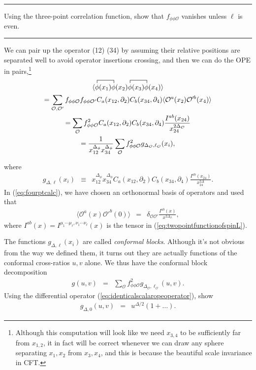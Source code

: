 \documentclass[12pt]{article}
\numberwithin{equation}{section}
\newcommand\be{\begin{eqnarray}}
\newcommand\ee{\end{eqnarray}}
\newcommand\f\phi
\newcommand\cO{\mathcal{O}}
\newcommand\p[1]{\left(#1\right)}
\newcommand\ptl\partial
\newcommand\<\langle
\renewcommand\>\rangle
\newcommand\de\delta
\renewcommand\.{\cdot}
\newcommand\SO{\mathrm{SO}}
\newcommand\De{\Delta}
\begin{document}

\noindent\rule[0.5ex]{\linewidth}{1pt}
\label{exercise:elleven}
Using the three-point correlation function, show that $f_{\f\f\cO}$ vanishes unless $\ell$ is even.

\noindent\rule[0.5ex]{\linewidth}{1pt}

We can pair up the operator (12) (34) by assuming their relative positions are separated well to avoid operator insertions crossing, and then we can do the OPE in pairs,\footnote{Although this computation will look like we need $x_{3,4}$ to be sufficiently far from $x_{1,2}$, it in fact will be correct whenever we can draw any sphere separating $x_1,x_2$ from $x_3,x_4$, and this is because the beautiful scale invariance in CFT.}
\begin{multline}
\<
\contraction{}{\f}{(x_1)}{\f}
\f(x_1)\f(x_2)
\contraction{}{\f}{(x_1)}{\f}
\f(x_3)\f(x_4)
\> \\
= \sum_{\cO,\cO'}f_{\f\f\cO}f_{\f\f\cO'} C_a(x_{12},\ptl_2)C_b(x_{34},\ptl_4)\<\cO^a(x_2)\cO'^b(x_4)\> \\
= \sum_\cO f_{\f\f\cO}^2 C_a(x_{12},\ptl_2)C_b(x_{34},\ptl_4)\frac{I^{ab}(x_{24})}{x_{24}^{2\De_\cO}} \\
= \frac{1}{x_{12}^{\De_\f} x_{34}^{\De_\f}}\sum_\cO f_{\f\f\cO}^2 g_{\De_\cO,\ell_\cO}(x_i),
\end{multline}

where
\be
\label{eq:olddefinitionofg}
g_{\De,\ell}(x_i) &\equiv& x_{12}^{\De_\f} x_{34}^{\De_\f} C_a(x_{12},\ptl_2)C_b(x_{34},\ptl_4)\frac{I^{ab}(x_{24})}{x_{24}^{2\De}}.
\ee
In (\ref{eq:fourptcalc}), we have chosen an orthonormal basis of operators and used that
\be
\label{eq:canonicallynormalizedtwopt}
\<\cO^a(x)\cO'^b(0)\> &=& \de_{\cO\cO'} \frac{I^{ab}(x)}{x^{2\De_\cO}},
\ee
where $I^{ab}(x)=I^{\mu_1\cdots\mu_\ell,\nu_1\cdots\nu_\ell}(x)$ is the tensor in (\ref{eq:twopointfunctionofspinL}).

The functions $g_{\De,\ell}(x_i)$ are called {\it conformal blocks}.  Although it's not obvious from the way we defined them, it turns out they are actually functions of the conformal cross-ratios $u,v$ alone.  We thus have the conformal block decomposition
\be
g(u,v) &=& \sum_\cO f_{\f\f\cO}^2 g_{\De_\cO,\ell_\cO}(u,v).
\ee
Using the differential operator (\ref{eq:identicalscalaropeoperator}), show
\be
\label{eq:boundaryconditionforblock}
g_{\De,0}(u,v) &=& u^{\De/2}\p{1+\dots}.
\ee
\end{document}
